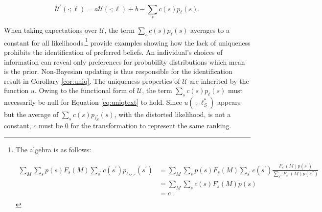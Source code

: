 \begin{equation}\label{eq:uniqtext}
	\mathcal{U}^{\prime} \left(\cdot ; \ell \right) = a \mathcal{U} \left( \cdot ; \ell  \right) + b - \sum_{s} c \left( s \right) p_{\ell} \left( s \right) .
\end{equation}

When taking expectations over \( \mathcal{U} \), the term \( \sum_{s}  c \left( s \right) p_{\ell} \left( s \right) \) averages to a constant for all likelihoods.\footnote{ The algebra is as follows:

	\begin{align*}
		\sum_{M } \sum_{s } p \left( s \right) F_s \left( M \right) \sum_{s^{\prime} } c \left( s^{\prime} \right) p_{\ell_{M,F}} \left( s^{\prime} \right) & = \sum_{M } \sum_{s } p \left( s \right) F_s \left( M \right) \sum_{s^{\prime} } c \left( s^{\prime} \right) \frac{F_{s^{\prime}} \left( M \right) p \left( s^{\prime} \right)}{\sum_{s^{\prime \prime} } F_{s^{\prime \prime}} \left( M \right) p \left( s^{\prime \prime} \right)} \\
		                                                                                                                                                    & = \sum_{M } \sum_{s } c \left( s \right) F_s \left( M \right) p \left( s \right)                                                                                                                                                                                                     \\
		                                                                                                                                                    & = c       \: .                                                                                                                                                                                                                                                                       \\
	\end{align*}

} \cite{eliazCanAnticipatoryFeelings2006} provide examples showing how the lack of uniqueness prohibits the identification of preferred beliefs. An individual's choices of information can reveal only preferences for probability distributions which mean is the prior. Non-Bayesian updating is thus responsible for the identification result in Corollary \ref{cor:uniq}. The uniqueness properties of \( \mathcal{U} \) are inherited by the function \( u \). Owing to the functional form of \( \mathcal{U} \), the term \( \sum_{s} c \left( s \right) p_{\ell} \left( s \right) \) must necessarily be null for Equation \eqref{eq:uniqtext} to hold. Since \( u \left( \cdot ; \ell^{*}_S  \right) \) appears but the average of \( \sum_{s}  c \left( s \right) p_{\ell^{*}_{S}} \left( s \right) \), with the distorted likelihood, is not a constant, \( c \) must be \( 0 \) for the transformation to represent the same ranking.

